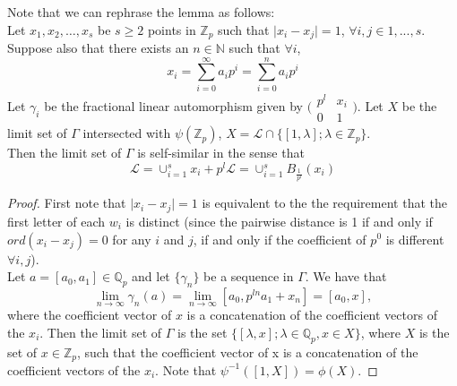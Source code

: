 \begin{framed}
Note that we can rephrase the lemma as follows:\\ Let $x_1,x_2,\ldots,x_s$ be $s \geq 2$ points in $\mathbb{Z}_p$ such that $\mid x_i - x_j \mid = 1$, $\forall i,j \in 1,...,s$. Suppose also that there exists an $n \in \mathbb{N}$ such that  $\forall i$, $$x_i = \sum_{i=0}^{\infty} a_ip^i = \sum_{i=0}^{n} a_ip^i $$ Let $\gamma_i$ be the fractional linear automorphism given by $\bigl( \begin{smallmatrix}p^l & x_i\\ 0 & 1 \end{smallmatrix}\bigr)$. 
Let $X$ be the limit set of $\Gamma$ intersected with $\psi(\mathbb{Z}_p)$, $X = \mathcal{L} \cap \{[1,\lambda]; \lambda \in \mathbb{Z}_p\}$.\\

Then the limit set of $\Gamma$ is self-similar in the sense that $$ \mathcal{L}= \cup_{i=1}^s x_i + p^l\mathcal{L} =\cup_{i=1}^s B_{\frac{1}{p^l}}(x_i)$$


\begin{proof}
	First note that $\mid x_i - x_j \mid =1$ is equivalent to the the requirement that the first letter of each $w_i$ is distinct (since the pairwise distance is 1 if and only if  $ord(x_i - x_j) = 0$ for any $i$ and $j$, if and only if the coefficient of $p^0$ is different $\forall i,j$).\\
	
	Let $a=[a_0,a_1] \in \mathbb{Q}_p$ and let $\{\gamma_n\}$ be a sequence in $\Gamma$. We have that $$\lim_{n\to\infty} \gamma_n(a) = \lim_{n\to\infty} [a_0, p^{ln}a_1 + x_n] = [a_0, x],$$ where the coefficient vector of $x$ is a concatenation of the coefficient vectors of the $x_i$. Then the limit set of $\Gamma$ is the set $\{[\lambda, x]; \lambda \in \mathbb{Q}_p, x \in X\}$, where $X$ is the set of $x \in \mathbb{Z}_p$, such that the coefficient vector of x is a concatenation of the coefficient vectors of the $x_i$. Note that $\psi^{-1}([1,X]) = \phi(X)$.
	 

\end{proof}

\end{framed}	

